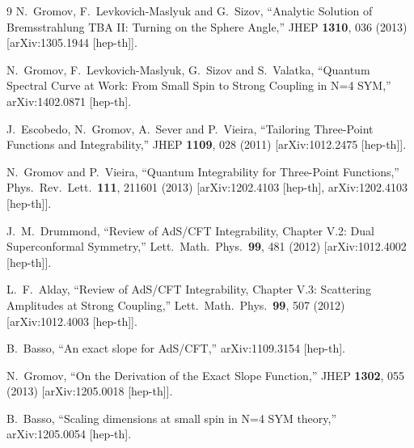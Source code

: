 \documentclass[a4paper]{article}
\numberwithin{equation}{section}
\begin{document}
\begin{thebibliography} {9}
  N.~Gromov, F.~Levkovich-Maslyuk and G.~Sizov,
  ``Analytic Solution of Bremsstrahlung TBA II: Turning on the Sphere Angle,''
  JHEP {\bf 1310}, 036 (2013)
  [arXiv:1305.1944 [hep-th]].
  
  N.~Gromov, F.~Levkovich-Maslyuk, G.~Sizov and S.~Valatka,
  ``Quantum Spectral Curve at Work: From Small Spin to Strong Coupling in N=4 SYM,''
  arXiv:1402.0871 [hep-th].
  
  J.~Escobedo, N.~Gromov, A.~Sever and P.~Vieira,
  ``Tailoring Three-Point Functions and Integrability,''
  JHEP {\bf 1109}, 028 (2011)
  [arXiv:1012.2475 [hep-th]].
  
  N.~Gromov and P.~Vieira,
  ``Quantum Integrability for Three-Point Functions,''
  Phys.\ Rev.\ Lett.\  {\bf 111}, 211601 (2013)
  [arXiv:1202.4103 [hep-th], arXiv:1202.4103 [hep-th]].
  
  J.~M.~Drummond,
  ``Review of AdS/CFT Integrability, Chapter V.2: Dual Superconformal Symmetry,''
  Lett.\ Math.\ Phys.\  {\bf 99}, 481 (2012)
  [arXiv:1012.4002 [hep-th]].
  
  L.~F.~Alday,
  ``Review of AdS/CFT Integrability, Chapter V.3: Scattering Amplitudes at Strong Coupling,''
  Lett.\ Math.\ Phys.\  {\bf 99}, 507 (2012)
  [arXiv:1012.4003 [hep-th]].
 
  B.~Basso,
  ``An exact slope for AdS/CFT,''
  arXiv:1109.3154 [hep-th].
  
  N.~Gromov,
  ``On the Derivation of the Exact Slope Function,''
  JHEP {\bf 1302}, 055 (2013)
  [arXiv:1205.0018 [hep-th]].
  
  B.~Basso,
  ``Scaling dimensions at small spin in N=4 SYM theory,''
  arXiv:1205.0054 [hep-th].
  
  
\end{thebibliography}
  
\end{document}
